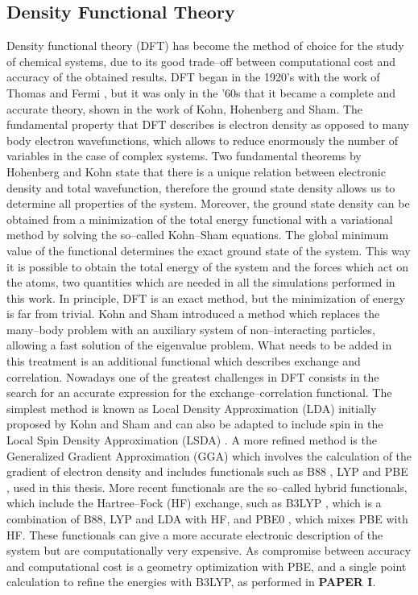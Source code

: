 \subsection*{Density Functional Theory}
Density functional theory (DFT) has become the method of choice for the study of chemical systems, due to its good trade--off between computational cost and accuracy of the obtained results. DFT began in the 1920’s with the work of Thomas and Fermi \cite{Thomas1927, Fermi1928}, but it was only in the ’60s that it became a complete and accurate theory, shown in the work of Kohn, Hohenberg and Sham\cite{Hohenberg1964}. The fundamental property that DFT describes is electron density as opposed to many body electron wavefunctions, which allows to reduce enormously the number of variables in the case of complex systems. Two fundamental theorems by Hohenberg and Kohn state that there is a unique relation between electronic density and total wavefunction, therefore the ground state density allows us to determine all properties of the system. Moreover, the ground state density can be obtained from a minimization of the total energy functional with a variational method by solving the so--called Kohn--Sham equations. The global minimum value of the functional determines the exact ground state of the system. This way it is possible to obtain the total energy of the system and the forces which act on the atoms, two quantities which are needed in all the simulations performed in this work. 
\npar
In principle, DFT is an exact method, but the minimization of energy is far from trivial. Kohn and Sham \cite{Kohn1965} introduced a method which replaces the many--body problem with an auxiliary system of non--interacting particles, allowing a fast solution of the eigenvalue problem. What needs to be added in this treatment is an additional functional which describes exchange and correlation. Nowadays one of the greatest challenges in DFT consists in the search for an accurate expression for the exchange--correlation functional.
The simplest method is known as Local Density Approximation (LDA) initially proposed by Kohn and Sham \cite{Kohn1965} and can also be adapted to include spin in the Local Spin Density Approximation (LSDA) \cite{Vosko1980}. A more refined method is the Generalized Gradient Approximation (GGA) which involves the calculation of the gradient of electron density and includes functionals such as B88 \cite{Becke1988}, LYP \cite{Lee1988} and PBE \cite{Perdew1996, Perdew1997}, used in this thesis. 
 More recent functionals are the so--called hybrid functionals, which include the Hartree--Fock (HF) exchange, such as B3LYP \cite{Becke1988, Becke1993, Lee1988}, which is a combination of B88, LYP and LDA with HF, and PBE0 \cite{Adamo1999}, which mixes PBE with HF. These functionals can give a more accurate electronic description of the system but are computationally very expensive. As compromise between accuracy and computational cost is a geometry optimization with PBE, and a single point calculation to refine the energies with B3LYP, as performed in \textbf{PAPER I}.

